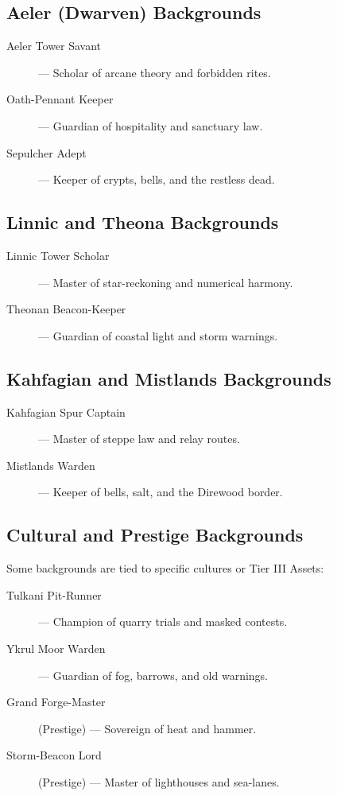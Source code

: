 \begin{itemize}
\subsection*{Aeler (Dwarven) Backgrounds}

\begin{description}
  \item[Aeler Tower Savant] — Scholar of arcane theory and forbidden rites.
  \item[Oath-Pennant Keeper] — Guardian of hospitality and sanctuary law.
  \item[Sepulcher Adept] — Keeper of crypts, bells, and the restless dead.
\end{description}

\subsection*{Linnic and Theona Backgrounds}

\begin{description}
  \item[Linnic Tower Scholar] — Master of star-reckoning and numerical harmony.
  \item[Theonan Beacon-Keeper] — Guardian of coastal light and storm warnings.
\end{description}

\subsection*{Kahfagian and Mistlands Backgrounds}

\begin{description}
  \item[Kahfagian Spur Captain] — Master of steppe law and relay routes.
  \item[Mistlands Warden] — Keeper of bells, salt, and the Direwood border.
\end{description}

\subsection*{Cultural and Prestige Backgrounds}

Some backgrounds are tied to specific cultures or Tier III Assets:

\begin{description}
  \item[Tulkani Pit-Runner] — Champion of quarry trials and masked contests.
  \item[Ykrul Moor Warden] — Guardian of fog, barrows, and old warnings.
  \item[Grand Forge-Master] (Prestige) — Sovereign of heat and hammer.
  \item[Storm-Beacon Lord] (Prestige) — Master of lighthouses and sea-lanes.
\end{description}


\end{itemize}
